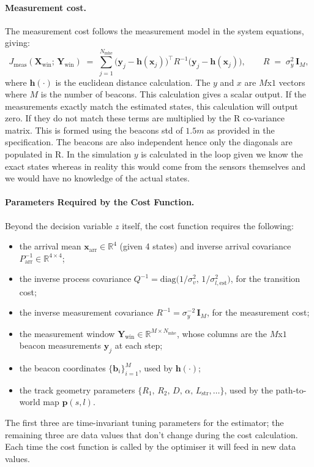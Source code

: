 \paragraph{Measurement cost.}
The measurement cost follows the measurement model in the system equations, giving:
\begin{equation}
    J_{\text{meas}}(\mathbf{X}_{\text{win}};\,\mathbf{Y}_{\text{win}}) \;=\; \sum_{j=1}^{N_{\text{mhe}}}
        \bigl(\mathbf{y}_{j} - \mathbf{h}(\mathbf{x}_{j})\bigr)^{\top}\!R^{-1}\bigl(\mathbf{y}_{j} - \mathbf{h}(\mathbf{x}_{j})\bigr),
    \qquad
    R \;=\; \sigma_{y}^{2}\,\mathbf{I}_{M},
    \label{eq:cost_meas}
\end{equation}
where $\mathbf{h}(\cdot)$ is the euclidean distance calculation. The $y$ and $x$ are $M$x$1$ vectors where $M$ is the number of beacons. This calculation gives a scalar output. If the measurements exactly match the estimated states, this calculation will output zero. If they do not match these terms are multiplied by the R co-variance matrix. This is formed using the beacons std of $1.5m$ as provided in the specification. The beacons are also independent hence only the diagonals are populated in R. In the simulation $y$ is calculated in the loop given we know the exact states whereas in reality this would come from the sensors themselves and we would have no knowledge of the actual states. 

\paragraph{Parameters Required by the Cost Function.}
Beyond the decision variable $z$ itself, the cost function requires the following:
\begin{itemize}
    \item the arrival mean $\mathbf{x}_{\text{arr}}\in\mathbb{R}^{4}$ (given 4 states) and inverse arrival covariance $P_{\text{arr}}^{-1}\in\mathbb{R}^{4\times 4}$;
    \item the inverse process covariance $Q^{-1} = \mathrm{diag}\!\bigl(1/\sigma_{v}^{2},\,1/\sigma_{l,\text{est}}^{2}\bigr)$, for the transition cost;
    \item the inverse measurement covariance $R^{-1} = \sigma_{y}^{-2}\,\mathbf{I}_{M}$, for the measurement cost;
    \item the measurement window $\mathbf{Y}_{\text{win}}\in\mathbb{R}^{M\times N_{\text{mhe}}}$, whose columns are the $M$x$1$ beacon measurements $\mathbf{y}_{j}$ at each step;
    \item the beacon coordinates $\{\mathbf{b}_{i}\}_{i=1}^{M}$, used by $\mathbf{h}(\cdot)$;
    \item the track geometry parameters $\{R_{1},\,R_{2},\,D,\,\alpha,\,L_{\text{str}},\ldots\}$, used by the path-to-world map $\mathbf{p}(s,l)$.
\end{itemize}
The first three are time-invariant tuning parameters for the estimator; the remaining three are data values that don't change during the cost calculation. Each time the cost function is called by the optimiser it will feed in new data values. 

